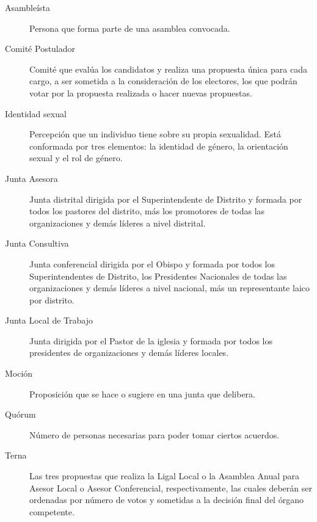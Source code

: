 
\begin{description}
    \item[Asambleísta] Persona que forma parte de una asamblea convocada.
    \item[Comité Postulador] Comité que evalúa los candidatos y realiza una propuesta única para cada cargo, a ser sometida a la consideración de los electores, los que podrán votar por la propuesta realizada o hacer nuevas propuestas.
    \item[Identidad sexual] Percepción que un individuo tiene sobre su propia sexualidad. Está conformada por tres elementos: la identidad de género, la orientación sexual y el rol de género.
    \item[Junta Asesora] Junta distrital dirigida por el Superintendente de Distrito y formada por todos los pastores del distrito, más los promotores de todas las organizaciones y demás líderes a nivel distrital.
    \item[Junta Consultiva] Junta conferencial dirigida por el Obispo y formada por todos los Superintendentes de Distrito, los Presidentes Nacionales de todas las organizaciones y demás líderes a nivel nacional, más un representante laico por distrito.
    \item[Junta Local de Trabajo] Junta dirigida por el Pastor de la iglesia y formada por todos los presidentes de organizaciones y demás líderes locales.
    \item[Moción] Proposición que se hace o sugiere en una junta que delibera.
    \item[Quórum] Número de personas necesarias para poder tomar ciertos acuerdos.
    \item[Terna] Las tres propuestas que realiza la Ligal Local o la Asamblea Anual para Asesor Local o Asesor Conferencial, respectivamente, las cuales deberán ser ordenadas por número de votos y sometidas a la decisión final del órgano competente.
\end{description}
